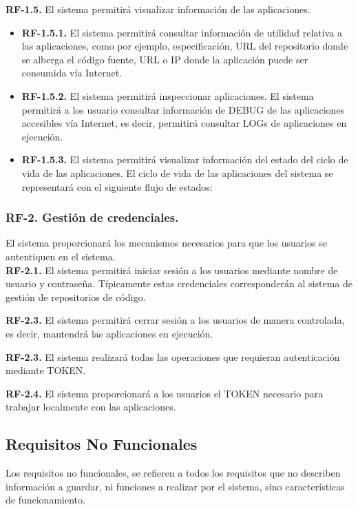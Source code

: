 \documentclass[a4paper,11pt]{book}
\begin{document}
\textbf{RF-1.5.} El sistema permitirá visualizar información de las aplicaciones.

\begin{itemize}
\item \textbf{RF-1.5.1.} El sistema permitirá consultar  información de utilidad relativa a las aplicaciones,  como por ejemplo, especificación, URL del repositorio donde se alberga el código fuente, URL o IP donde la aplicación puede ser consumida vía Internet.
\item \textbf{RF-1.5.2.} El sistema permitirá inspeccionar aplicaciones. El sistema permitirá a los usuario consultar información de DEBUG de las aplicaciones accesibles vía Internet, es decir, permitirá consultar LOGs de aplicaciones en ejecución.
\item \textbf{RF-1.5.3.} El sistema permitirá visualizar información del estado del ciclo de vida de las aplicaciones. El ciclo de vida de las aplicaciones del sistema se representará con el siguiente flujo de estados:\\
\end{itemize}


\subsubsection { \textbf{ RF-2. Gestión de credenciales.}} El sistema proporcionará los mecanismos necesarios para que los usuarios se autentiquen en el sistema. \\


\textbf{RF-2.1.} El sistema  permitirá iniciar sesión  a los usuarios mediante nombre de usuario y contraseña. Típicamente estas credenciales corresponderán al sistema de gestión de repositorios de código.

\textbf{RF-2.3.} El sistema  permitirá cerrar sesión a los usuarios de manera controlada, es decir, mantendrá las aplicaciones en ejecución.

\textbf{RF-2.3.} El sistema  realizará todas las operaciones que requieran autenticación mediante TOKEN.

\textbf{RF-2.4.} El sistema  proporcionará a los usuarios el TOKEN necesario para trabajar localmente con las aplicaciones.


\subsection{Requisitos No Funcionales }
Los requisitos no funcionales, se refieren a todos los requisitos que no describen información a guardar, ni funciones a realizar por el sistema, sino características de funcionamiento.\\
\end{document}
